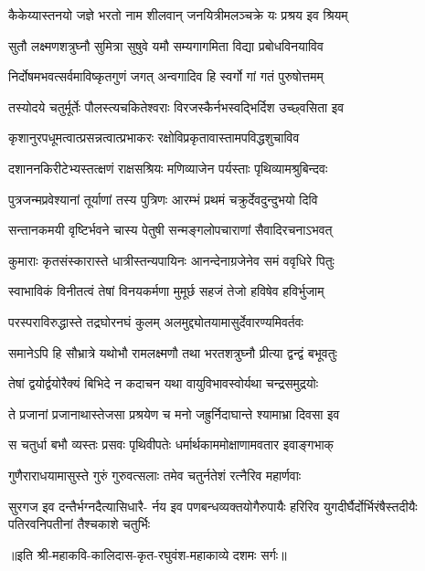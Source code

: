 \twolineshloka
{कैकेय्यास्तनयो जज्ञे भरतो नाम शीलवान्}
{जनयित्रीमलञ्चक्रे यः प्रश्रय इव श्रियम्} %

\twolineshloka
{सुतौ लक्ष्मणशत्रुघ्नौ सुमित्रा सुषुवे यमौ}
{सम्यगागमिता विद्या प्रबोधविनयाविव} %

\twolineshloka
{निर्दोषमभवत्सर्वमाविष्कृतगुणं जगत्}
{अन्वगादिव हि स्वर्गो गां गतं पुरुषोत्तमम्} %

\twolineshloka
{तस्योदये चतुर्मूर्तेः पौलस्त्यचकितेश्वराः}
{विरजस्कैर्नभस्वद्भिर्दिश उच्छ्वसिता इव} %

\twolineshloka
{कृशानुरपधूमत्वात्प्रसन्नत्वात्प्रभाकरः}
{रक्षोविप्रकृतावास्तामपविद्धशुचाविव} %

\twolineshloka
{दशाननकिरीटेभ्यस्तत्क्षणं राक्षसश्रियः}
{मणिव्याजेन पर्यस्ताः पृथिव्यामश्रुबिन्दवः} %

\twolineshloka
{पुत्रजन्मप्रवेश्यानां तूर्याणां तस्य पुत्रिणः}
{आरम्भं प्रथमं चक्रुर्देवदुन्दुभयो दिवि} %

\twolineshloka
{सन्तानकमयी वृष्टिर्भवने चास्य पेतुषी}
{सन्मङ्गलोपचाराणां सैवादिरचनाऽभवत्} %

\twolineshloka
{कुमाराः कृतसंस्कारास्ते धात्रीस्तन्यपायिनः}
{आनन्देनाग्रजेनेव समं ववृधिरे पितुः} %

\twolineshloka
{स्वाभाविकं विनीतत्वं तेषां विनयकर्मणा}
{मुमूर्छ सहजं तेजो हविषेव हविर्भुजाम्} %

\twolineshloka
{परस्पराविरुद्धास्ते तद्रघोरनघं कुलम्}
{अलमुद्द्योतयामासुर्देवारण्यमिवर्तवः} %

\twolineshloka
{समानेऽपि हि सौभ्रात्रे यथोभौ रामलक्ष्मणौ}
{तथा भरतशत्रुघ्नौ प्रीत्या द्वन्द्वं बभूवतुः} %

\twolineshloka
{तेषां द्वयोर्द्वयोरैक्यं बिभिदे न कदाचन}
{यथा वायुविभावस्वोर्यथा चन्द्रसमुद्रयोः} %

\twolineshloka
{ते प्रजानां प्रजानाथास्तेजसा प्रश्रयेण च}
{मनो जह्रुर्निदाघान्ते श्यामाभ्रा दिवसा इव} %

\twolineshloka
{स चतुर्धा बभौ व्यस्तः प्रसवः पृथिवीपतेः}
{धर्मार्थकाममोक्षाणामवतार इवाङ्गभाक्} %

\twolineshloka
{गुणैराराधयामासुस्ते गुरुं गुरुवत्सलाः}
{तमेव चतुर्नतेशं रत्नैरिव महार्णवाः} %

\fourlineindentedshloka
{सुरगज इव दन्तैर्भग्नदैत्यासिधारै-}
{र्नय इव पणबन्धव्यक्तयोगैरुपायैः}
{हरिरिव युगदीर्घैर्दोर्भिरंषैस्तदीयैः}
{पतिरवनिपतीनां तैश्चकाशे चतुर्भिः} %

॥इति श्री-महाकवि-कालिदास-कृत-रघुवंश-महाकाव्ये दशमः सर्गः॥


